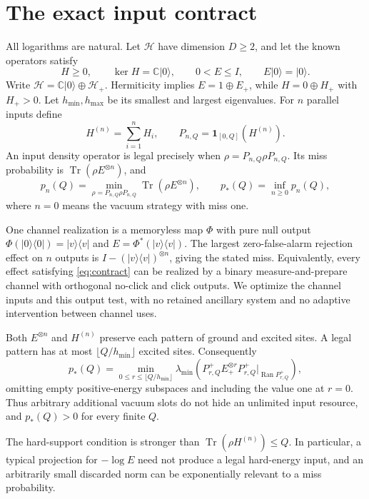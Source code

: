 \documentclass[11pt,a4paper]{article}
\theoremstyle{remark}
\DeclareMathOperator{\Tr}{Tr}
\DeclareMathOperator{\Ran}{Ran}
\newcommand{\ket}[1]{|#1\rangle}
\newcommand{\bra}[1]{\langle #1|}
\newcommand{\ep}{E_+}
\newcommand{\hp}{H_+}
\newcommand{\popt}{p_*}
\begin{document}
\section{The exact input contract}
All logarithms are natural. Let \(\mathcal H\) have dimension \(D\geq2\), and
let the known operators satisfy
\begin{equation}\label{eq:contract}
 H\geq0,\qquad \ker H=\mathbb C\ket0,\qquad
 0<E\leq I,\qquad E\ket0=\ket0.
\end{equation}
Write \(\mathcal H=\mathbb C\ket0\oplus\mathcal H_+\).
Hermiticity implies \(E=1\oplus\ep\), while \(H=0\oplus\hp\) with
\(\hp>0\). Let \(h_{\min},h_{\max}\) be its smallest and largest eigenvalues.
For \(n\) parallel inputs define
\[
 H^{(n)}=\sum_{i=1}^n H_i,\qquad
 P_{n,Q}=\mathbf1_{[0,Q]}(H^{(n)}).
\]
An input density operator is legal precisely when
\(\rho=P_{n,Q}\rho P_{n,Q}\). Its miss probability is
\(\Tr(\rho E^{\otimes n})\), and
\begin{equation}\label{eq:missdef}
 p_n(Q)=\min_{\rho=P_{n,Q}\rho P_{n,Q}}\Tr(\rho E^{\otimes n}),\qquad
 \popt(Q)=\inf_{n\geq0}p_n(Q),
\end{equation}
where \(n=0\) means the vacuum strategy with miss one.

One channel realization is a memoryless map \(\Phi\) with pure null output
\(\Phi(\ket0\bra0)=\ket v\bra v\) and
\(E=\Phi^*(\ket v\bra v)\). The largest zero-false-alarm rejection effect
on \(n\) outputs is \(I-(\ket v\bra v)^{\otimes n}\), giving the stated miss.
Equivalently, every effect satisfying \eqref{eq:contract} can be realized by
a binary measure-and-prepare channel with orthogonal no-click and click
outputs. We optimize the channel inputs and this output test, with no
retained ancillary system and no adaptive intervention between channel uses.

Both \(E^{\otimes n}\) and \(H^{(n)}\) preserve each pattern of ground and
excited sites. A legal pattern has at most
\(\lfloor Q/h_{\min}\rfloor\) excited sites. Consequently
\begin{equation}\label{eq:groundreduction}
 \popt(Q)=\min_{0\leq r\leq\lfloor Q/h_{\min}\rfloor}
 \lambda_{\min}\left(
  P^+_{r,Q}\ep^{\otimes r}P^+_{r,Q}\big|_{\Ran P^+_{r,Q}}\right),
\end{equation}
omitting empty positive-energy subspaces and including the value one at
\(r=0\). Thus arbitrary additional vacuum slots do not hide an unlimited
input resource, and \(\popt(Q)>0\) for every finite \(Q\).

The hard-support condition is stronger than
\(\Tr(\rho H^{(n)})\leq Q\). In particular, a typical projection for
\(-\log E\) need not produce a legal hard-energy input, and an arbitrarily
small discarded norm can be exponentially relevant to a miss probability.
\end{document}
